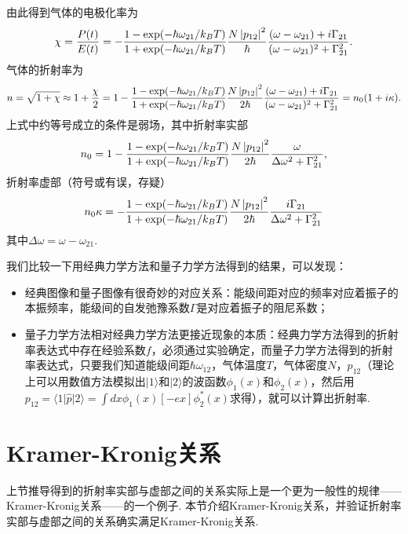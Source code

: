 \documentclass{assignment}
\begin{document}
由此得到气体的电极化率为
\begin{align}
    \chi=\frac{P(t)}{E(t)}=-\frac{1-\exp(-\hbar\omega_{21}/k_BT)}{1+\exp(-\hbar\omega_{21}/k_BT)}\frac{N\left\lvert p_{12}\right\rvert^2}{\hbar}\frac{(\omega-\omega_{21})+i\Gamma_{21}}{(\omega-\omega_{21})^2+\Gamma_{21}^2}.
\end{align}
气体的折射率为
\begin{align}
    n=\sqrt{1+\chi}\approx 1+\frac{\chi}{2}=1-\frac{1-\exp(-\hbar\omega_{21}/k_BT)}{1+\exp(-\hbar\omega_{21}/k_BT)}\frac{N\left\lvert p_{12}\right\rvert^2}{2\hbar}\frac{(\omega-\omega_{21})+i\Gamma_{21}}{(\omega-\omega_{21})^2+\Gamma_{21}^2}=n_0(1+i\kappa).
\end{align}
上式中约等号成立的条件是弱场，其中折射率实部
\begin{align}
    n_0=1-\frac{1-\exp(-\hbar\omega_{21}/k_BT)}{1+\exp(-\hbar\omega_{21}/k_BT)}\frac{N\left\lvert p_{12}\right\rvert^2}{2\hbar}\frac{\omega}{\Delta\omega^2+\Gamma_{21}^2},
\end{align}
折射率虚部（符号或有误，存疑）
\begin{align}
    n_0\kappa=-\frac{1-\exp(-\hbar\omega_{21}/k_BT)}{1+\exp(-\hbar\omega_{21}/k_BT)}\frac{N\left\lvert p_{12}\right\rvert^2}{2\hbar}\frac{i\Gamma_{21}}{\Delta\omega^2+\Gamma_{21}^2}
\end{align}
其中$\Delta\omega=\omega-\omega_{21}$.

我们比较一下用经典力学方法和量子力学方法得到的结果，可以发现：
\begin{itemize}
    \item 经典图像和量子图像有很奇妙的对应关系：能级间距对应的频率对应着振子的本振频率，能级间的自发弛豫系数$\Gamma$是对应着振子的阻尼系数；
    \item 量子力学方法相对经典力学方法更接近现象的本质：经典力学方法得到的折射率表达式中存在经验系数$f$，必须通过实验确定，而量子力学方法得到的折射率表达式，只要我们知道能级间距$\hbar\omega_{12}$，气体温度$T$，气体密度$N$，$p_{12}$（理论上可以用数值方法模拟出$\lvert 1\rangle$和$\lvert 2\rangle$的波函数$\phi_1(x)$和$\phi_2(x)$，然后用$p_{12}=\langle 1\rvert\hat{p}\lvert 2\rangle=\int dx\phi_1(x)[-ex]\phi_2^*(x)$求得），就可以计算出折射率.
\end{itemize}

\section{Kramer-Kronig关系}
上节推导得到的折射率实部与虚部之间的关系实际上是一个更为一般性的规律——Kramer-Kronig关系——的一个例子. 本节介绍Kramer-Kronig关系，并验证折射率实部与虚部之间的关系确实满足Kramer-Kronig关系.
\end{document}
